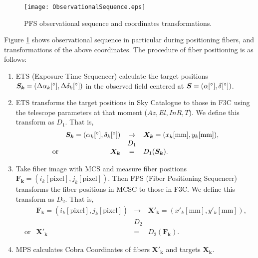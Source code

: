 \begin{figure}[!ht]
\begin{center}
\texttt{[image: ObservationalSequence.eps]}
\end{center}
\caption{PFS observational sequence and coordinates transformations.
}
\label{fig:obssec}
\end{figure}

Figure \ref{fig:obssec} shows observational sequence in particular during positioning fibers, and transformations of the above coordinates.
The procedure of fiber positioning is as follows:
\begin{enumerate}
\item ETS (Exposure Time Sequencer) calculate the target positions $\bm{S_k}=(\Delta \alpha _k [ ^\circ ], \Delta \delta _k [ ^\circ ])$ in the observed field centered at $\bm{S}=(\alpha [ ^\circ ], \delta [ ^\circ ])$.
\item ETS transforms the target positions in Sky Catalogue to those in F3C using the telescope parameters at that moment ($Az, El, InR, T$).
We define this transform as $D_1$.
That is,
\begin{equation}
\begin{array}{crcl}
& \bm{S_k}=(\alpha _k [ ^\circ ], \delta _k [ ^\circ ]) & \rightarrow & \bm{X_k}=(x_k [ \mathrm{mm} ], y_k [ \mathrm{mm} ]), \\
& & D_1 & \\
\mathrm{or} & \bm{X_k} &= & D_1(\bm{S_k}).
\end{array}
\end{equation}
\item\label{item:mcs2f3c} Take fiber image with MCS and measure fiber positions $\bm{F_k}=(i_k [ \mathrm{pixel} ], j_k [ \mathrm{pixel} ])$.
Then FPS (Fiber Positioning Sequencer) transforms the fiber positions in MCSC to those in F3C.
We define this transform as $D_2$.
That is,
\begin{equation}
\begin{array}{crcl}
& \bm{F_k}=(i_k [ \mathrm{pixel} ], j_k [ \mathrm{pixel} ]) & \rightarrow & \bm{X'_k}=(x'_k [ \mathrm{mm} ], y'_k [ \mathrm{mm} ]), \\
& & D_2 & \\
\mathrm{or} & \bm{X'_k} & = & D_2(\bm{F_k}).
\end{array}
\end{equation}
\item\label{item:f3c2cobra} MPS calculates Cobra Coordinates of fibers $\bm{X'_k}$ and targets $\bm{X_k}$.

\end{enumerate}
